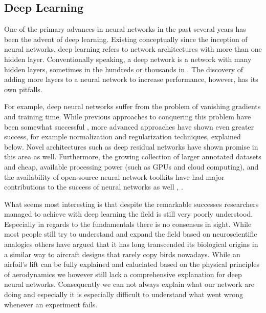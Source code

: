 


\subsection{Deep Learning}

One of the primary advances in neural networks in the past several years has been the advent of deep learning.  Existing conceptually since the inception of neural networks, deep learning refers to network architectures with more than one hidden layer.  Conventionally speaking, a deep network is a network with many hidden layers, sometimes in the hundreds or thousands in \cite{DBLP:journals/corr/HeZRS15}. The discovery of adding more layers to a neural network to increase performance, however, has its own pitfalls.

For example, deep neural networks suffer from the problem of vanishing gradients \cite{Hochreiter:01book} and training time.  While previous approaches to conquering this problem have been somewhat successful \cite{DBLP:journals/corr/abs-1206-5533}, more advanced approaches have shown even greater success, for example normalization and regularization techniques, explained below.  Novel architectures such as deep residual networks \cite{DBLP:journals/corr/HeZRS15} have shown promise in this area as well.  Furthermore, the growing collection of larger annotated datasets and cheap, available processing power (such as GPUs and cloud computing), and the availability of open-source neural network toolkits have had major contributions to the success of neural networks as well \cite{tensorflow2015-whitepaper}, \cite{DBLP:journals/corr/SynnaeveNACLLRU16}. %

What seems most interesting is that despite the remarkable successes researchers managed to achieve with deep learning the field is still very poorly understood. Especially in regards to the fundamentals there is no consensus in sight. While most people still try to understand and expand the field based on neuroscientific analogies others have argued that it has long transcended its biological origins in a similar way to aircraft designs that rarely copy birds nowadays. While an airfoil's lift can be fully explained and caluclated based on the physical principles of aerodynamics we however still lack a comprehensive explanation for deep neural networks. Consequently we can not always explain what our network are doing and especially it is especially difficult to understand what went wrong whenever an experiment fails.

